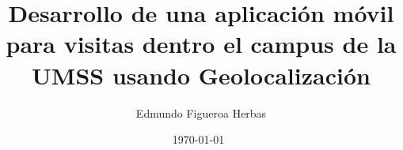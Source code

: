 \documentclass[11pt,letterpaper,oneside,openright]{book}
\title{Desarrollo de una aplicaci\'on móvil para visitas dentro el campus de la UMSS usando Geolocalización}
\author{Edmundo Figueroa Herbas}
\date{\today \ }
\begin{document}
% 
\frontmatter
  \maketitle
  \tableofcontents

\mainmatter{}
  
  

\backmatter{}
  
\end{document}
